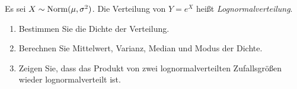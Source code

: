 

Es sei $X \sim \mathrm{Norm}(\mu, \sigma^2)$. Die Verteilung von $Y = e^X$
hei{\ss}t \textit{Lognormalverteilung}.

\begin{enumerate}[label=\alph*)]
 \item  Bestimmen Sie die Dichte der Verteilung.
 \item Berechnen Sie Mittelwert, Varianz, Median und Modus der Dichte.
 \item  Zeigen Sie, dass das Produkt von zwei lognormalverteilten
       Zufallsgr\"o{\ss}en wieder lognormalverteilt ist.
\end{enumerate}

\answer{}

